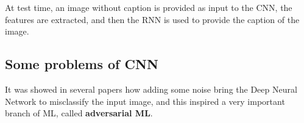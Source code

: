 At test time, an image without caption is provided as input to the CNN, the features are extracted, and then the RNN is used to provide the caption of the image.

\subsection{Some problems of CNN}
It was showed in several papers how adding some noise bring the Deep Neural Network to misclassify the input image, and this inspired a very important branch of ML, called \textbf{adversarial ML}.
